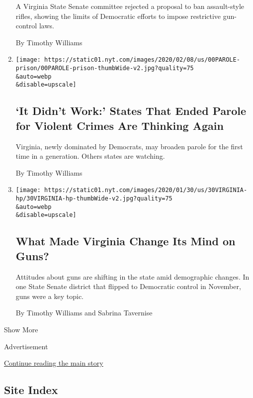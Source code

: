 \begin{enumerate}
  A Virginia State Senate committee rejected a proposal to ban
  assault-style rifles, showing the limits of Democratic efforts to
  impose restrictive gun-control laws.

  By Timothy Williams
\item
  \href{/2020/02/13/us/parole-virginia.html}{}

  \texttt{[image: https://static01.nyt.com/images/2020/02/08/us/00PAROLE-prison/00PAROLE-prison-thumbWide-v2.jpg?quality=75\\\&auto=webp\\\&disable=upscale]}

  \hypertarget{it-didnt-work-states-that-ended-parole-for-violent-crimes-are-thinking-again}{%
  \subsection{`It Didn't Work:' States That Ended Parole for Violent
  Crimes Are Thinking
  Again}\label{it-didnt-work-states-that-ended-parole-for-violent-crimes-are-thinking-again}}

  Virginia, newly dominated by Democrats, may broaden parole for the
  first time in a generation. Others states are watching.

  By Timothy Williams
\item
  \href{/2020/01/30/us/virginia-gun-limits.html}{}

  \texttt{[image: https://static01.nyt.com/images/2020/01/30/us/30VIRGINIA-hp/30VIRGINIA-hp-thumbWide-v2.jpg?quality=75\\\&auto=webp\\\&disable=upscale]}

  \hypertarget{what-made-virginia-change-its-mind-on-guns}{%
  \subsection{What Made Virginia Change Its Mind on
  Guns?}\label{what-made-virginia-change-its-mind-on-guns}}

  Attitudes about guns are shifting in the state amid demographic
  changes. In one State Senate district that flipped to Democratic
  control in November, guns were a key topic.

  By Timothy Williams and Sabrina Tavernise
\end{enumerate}

Show More

Advertisement

\protect\hyperlink{after-mid2}{Continue reading the main story}

\hypertarget{site-index}{%
\subsection{Site Index}\label{site-index}}

